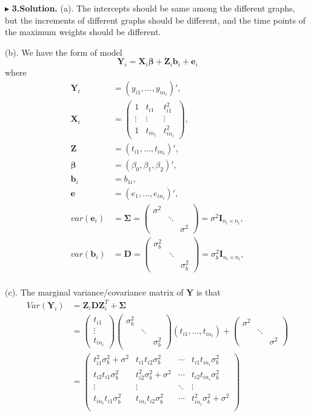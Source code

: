 \documentclass[letterpaper, 12pt]{article}
\newcommand{\ba}{$$\begin{aligned}}
\newcommand{\ea}{\end{aligned}$$}
\begin{document}
$\blacktriangleright$ \textbf{3.\quad Solution.} 
(a). The intercepts should be same among the different graphs, but the increments of different graphs should be different, and the time points of the maximum weights should be different.


(b). We have the form of model 
$$
\bm{Y}_i=\bm{X}_i\bm{\beta}+\bm{Z}_i\bm{b}_i+\bm{e}_i
$$
where 
\ba
\bm{Y}_i&=(y_{i1},\dots,y_{in_i})',\\
\bm{X}_i&=\left(\begin{matrix}
1&t_{i1}&t_{i1}^2\\
\vdots&\vdots&\vdots\\
1&t_{in_i}&t_{in_i}^2\end{matrix}\right),\\
\bm{Z}&=(t_{i1},\dots,t_{in_i})',\\
\bm{\beta}&=(\beta_0,\beta_1,\beta_2)',\\
\bm{b}_i&=b_{1i},\\
\bm{e}&=(e_1,\dots,e_{in_i})',\\
var(\bm{e}_i)&=\bm{\Sigma}=\left(\begin{matrix}
\sigma^2\\
&\ddots\\
&&\sigma^2\end{matrix}\right)=\sigma^2\bm{I}_{n_i\times n_i},\\
var(\bm{b}_i)&=\bm{D}=\left(\begin{matrix}
\sigma_b^2\\
&\ddots\\
&&\sigma_b^2\end{matrix}\right)=\sigma_b^2\bm{I}_{n_i\times n_i},\\
\ea


(c). The marginal variance/covariance matrix of $\bm{Y}$ is that
\ba
Var(\bm{Y}_i)&=\bm{Z}_i\bm{DZ}_i^T+\bm{\Sigma}\\
&=\left(\begin{matrix}
t_{i1}\\
\vdots\\
t_{in_i}\end{matrix}\right)
\left(\begin{matrix}
\sigma_b^2\\
&\ddots\\
&&\sigma_b^2\end{matrix}\right)
(t_{i1},\dots,t_{in_i})+\left(\begin{matrix}
\sigma^2\\
&\ddots\\
&&\sigma^2\end{matrix}\right)\\
&=\left(\begin{matrix}
t_{i1}^2\sigma_b^2+\sigma^2&t_{i1}t_{i2}\sigma_b^2&\cdots&t_{i1}t_{in_i}\sigma_b^2\\
t_{i2}t_{i1}\sigma_b^2&t_{i2}^2\sigma_b^2+\sigma^2&\cdots&t_{i2}t_{in_i}\sigma_b^2\\
\vdots&\vdots&\ddots&\vdots\\
t_{in_i}t_{i1}\sigma_b^2&t_{in_i}t_{i2}\sigma_b^2&\cdots&t_{in_i}^2\sigma_b^2+\sigma^2\\
\end{matrix}\right)
\ea
\end{document}
